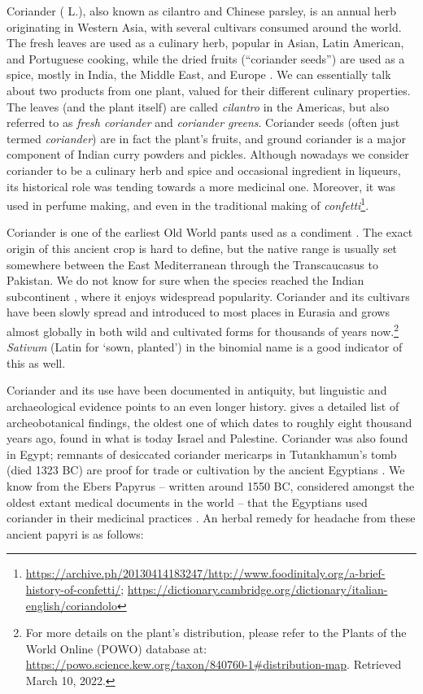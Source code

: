 Coriander ( L.), also known as cilantro and Chinese parsley, is an annual herb originating in Western Asia, with several \glspl{cultivar} consumed around the world. The fresh leaves are used as a culinary herb, popular in Asian, Latin American, and Portuguese cooking, while the dried fruits (``coriander seeds'') are used as a spice, mostly in India, the Middle East, and Europe \parencite{davidson_oxford_2014}. We can essentially talk about two products from one plant, valued for their different culinary properties. The leaves (and the plant itself) are called \textit{cilantro} in the Americas, but also referred to as \textit{fresh coriander} and \textit{coriander greens}. Coriander seeds (often just termed \textit{coriander}) are in fact the plant’s fruits, and ground coriander is a major component of Indian curry powders and pickles. Although nowadays we consider coriander to be a culinary herb and spice and occasional ingredient in liqueurs, its historical role was tending towards a more medicinal one. Moreover, it was used in perfume making, and even in the traditional making of \textit{confetti}\footnote{\url{https://archive.ph/20130414183247/http://www.foodinitaly.org/a-brief-history-of-confetti/}; \url{https://dictionary.cambridge.org/dictionary/italian-english/coriandolo}}.

Coriander is one of the earliest Old World pants used as a condiment \parencite{zohary_domestication_2012}. The exact origin of this ancient crop is hard to define, but the native range is usually set somewhere between the East Mediterranean through the Transcaucasus to Pakistan. We do not know for sure when the species reached the Indian subcontinent \parencite{prance_cultural_2005}, where it enjoys widespread popularity. Coriander and its cultivars have been slowly spread and introduced to most places in Eurasia and grows almost globally in both wild and cultivated forms for thousands of years now.\footnote{For more details on the plant’s distribution, please refer to the Plants of the World Online (POWO) database at: \url{https://powo.science.kew.org/taxon/840760-1\#distribution-map}. Retrieved March 10, 2022.} \textit{Sativum} (Latin for `sown, planted') in the binomial name is a good indicator of this as well.

Coriander and its use have been documented in antiquity, but linguistic and archaeological evidence points to an even longer history. \textcite[163]{zohary_domestication_2012} gives a detailed list of archeobotanical findings, the oldest one of which dates to roughly eight thousand years ago, found in what is today Israel and Palestine. Coriander was also found in Egypt; remnants of desiccated coriander mericarps in Tutankhamun’s tomb (died 1323 BC) are proof for trade or cultivation by the ancient Egyptians \parencite{zohary_domestication_2012}. We know from the Ebers Papyrus – written around 1550 BC, considered amongst the oldest extant medical documents in the world – that the Egyptians used coriander in their medicinal practices \parencite{prance_cultural_2005}. An herbal remedy for headache from these ancient papyri is as follows:


